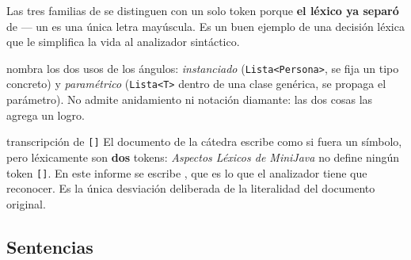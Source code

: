 \begin{producciones}
\end{producciones}

Las tres familias de  se distinguen con un solo token porque \textbf{el léxico ya
separó}  de  --- un  es una única letra mayúscula. Es un buen
ejemplo de una decisión léxica que le simplifica la vida al analizador sintáctico.

 nombra los dos usos de los ángulos: \emph{instanciado}
(\texttt{Lista<Persona>}, se fija un tipo concreto) y \emph{paramétrico} (\texttt{Lista<T>} dentro
de una clase genérica, se propaga el parámetro). No admite anidamiento ni notación diamante: las
dos cosas las agrega un logro.

\begin{decision}{transcripción de \texttt{[]}}
El documento de la cátedra escribe \tl{[]} como si fuera un símbolo, pero léxicamente son
\textbf{dos} tokens: \emph{Aspectos Léxicos de MiniJava} no define ningún token
\texttt{[]}. En este informe se escribe \tl{[} \tl{]}, que es lo que el analizador tiene que
reconocer. Es la única desviación deliberada de la literalidad del documento original.
\end{decision}

\subsection{Sentencias}

\begin{producciones}
\end{producciones}

